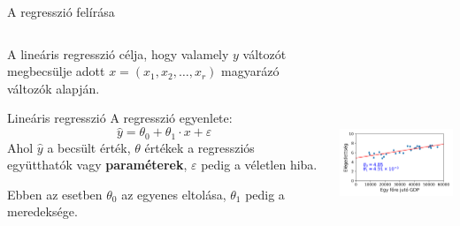\documentclass[english, aspectratio=169]{beamer}
\begin{document}
\begin{frame}{A regresszió felírása}
\begin{columns}
\begin{column}{.5\textwidth}
A lineáris regresszió célja, hogy valamely $y$ változót megbecsülje adott $x=\left(x_1,x_2,\ldots,x_r \right)$ magyarázó változók alapján.
\begin{block}{Lineáris regresszió}
A regresszió egyenlete:
\[
\hat{y} = \theta_0 + \theta_1 \cdot x + \varepsilon
\]
Ahol $\hat{y}$ a becsült érték, $\theta$ értékek a regressziós együtthatók vagy \textbf{paraméterek}, $\varepsilon$ pedig a véletlen hiba.
\end{block}
Ebben az esetben $\theta_0$ az egyenes eltolása, $\theta_1$ pedig a meredeksége. 
\end{column}
\begin{column}{.5\textwidth}
\begin{center}
\includegraphics[width=7cm, height=7cm, keepaspectratio]{images/regresszio_7.png}
\end{center}
\end{column}
\end{columns}
\end{frame}
\end{document}
